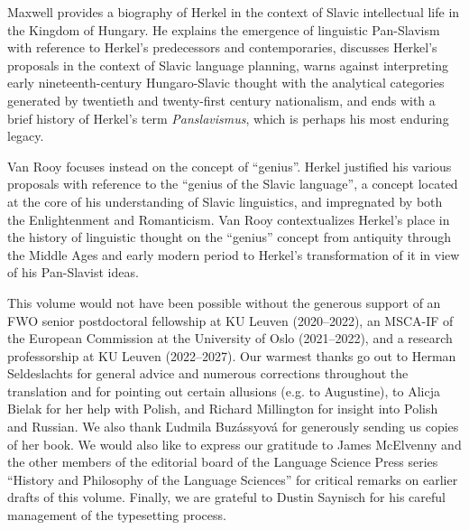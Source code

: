 Maxwell provides a biography of Herkel in the context of Slavic intellectual life in the Kingdom of Hungary. He explains the emergence of linguistic Pan-Slavism with reference to Herkel’s predecessors and contemporaries, discusses Herkel’s proposals in the context of Slavic language planning, warns against interpreting early nineteenth-century Hungaro-Slavic thought with the analytical categories generated by twentieth and twenty-first century nationalism, and ends with a brief history of Herkel’s term \textit{Panslavismus}, which is perhaps his most enduring legacy.

Van Rooy focuses instead on the concept of “genius”. Herkel justified his various proposals with reference to the “genius of the Slavic language”, a concept located at the core of his understanding of Slavic linguistics, and impregnated by both the Enlightenment and Romanticism. Van Rooy contextualizes Herkel’s place in the history of linguistic thought on the “genius” concept from antiquity through the Middle Ages and early modern period to Herkel’s transformation of it in view of his Pan-Slavist ideas.

This volume would not have been possible without the generous support of an FWO senior postdoctoral fellowship at KU Leuven (2020--2022), an MSCA-IF of the European Commission at the University of Oslo (2021--2022), and a research professorship at KU Leuven (2022--2027). Our warmest thanks go out to Herman Seldeslachts for general advice and numerous corrections throughout the translation and for pointing out certain allusions (e.g. to Augustine), to Alicja Bielak for her help with Polish, and Richard Millington for insight into Polish and Russian. We also thank Ľudmila Buzássyová for generously sending us copies of her book. We would also like to express our gratitude to James McElvenny and the other members of the editorial board of the Language Science Press series “History and Philosophy of the Language Sciences” for critical remarks on earlier drafts of this volume. Finally, we are grateful to Dustin Saynisch for his careful management of the typesetting process.